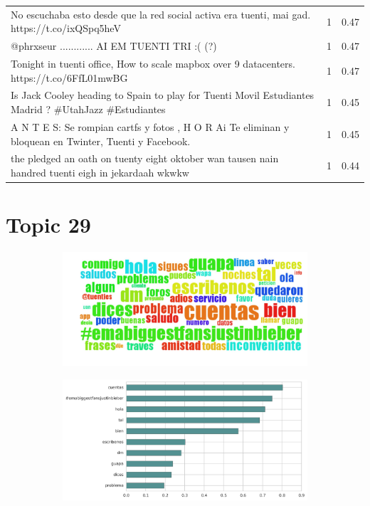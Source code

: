 \begin{longtable}{p{12.5cm}rr}
No escuchaba esto desde que la red social activa era tuenti, mai gad. https://t.co/ixQSpq5heV & 1 & 0.47 \\
@phrxseur ............ AI EM TUENTI TRI :( (?) & 1 & 0.47 \\
Tonight in tuenti office, How to scale mapbox over 9 datacenters. https://t.co/6FfL01mwBG & 1 & 0.47 \\
Is Jack Cooley heading to Spain to play for Tuenti Movil Estudiantes Madrid ? \#UtahJazz  \#Estudiantes & 1 & 0.45 \\
A N T E S: Se rompian cartfs y fotos , H O R Ai Te eliminan y bloquean en Twinter, Tuenti y Facebook. & 1 & 0.45 \\
the pledged an oath on tuenty eight oktober wan tausen nain handred tuenti eigh in jekardaah wkwkw & 1 & 0.44 \\

\end{longtable}
\clearpage

\section{Topic 29}

\begin{figure}[htbp!]
    \centering
    \begin{subfigure}[b]{0.49\textwidth}
        \includegraphics[width=\textwidth]{twitter_all/report_images/topic-29-wordcloud.jpg}
    \end{subfigure}
    \begin{subfigure}[b]{0.49\textwidth}
        \includegraphics[width=\textwidth]{twitter_all/report_images/topic-29-terms.jpg}
    \end{subfigure}
\end{figure}

